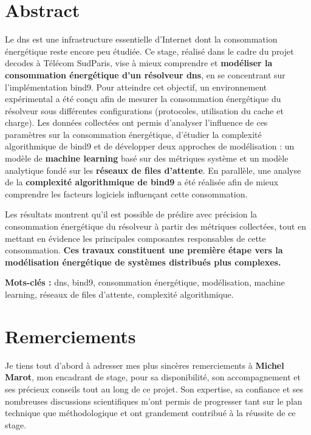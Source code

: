 \documentclass[12pt, a4paper]{report}
\begin{document}
	\renewcommand{\labelitemii}{$\bullet$}

	\arialfont
	\glsdisablehyper


	\makeutbmfrontcover{}
 
	\section*{Abstract}
	\sloppy	
	\noindent Le \gls{dns} est une infrastructure essentielle d'Internet dont la consommation énergétique reste encore peu étudiée. Ce stage, réalisé dans le cadre du projet \gls{decodes} à Télécom SudParis, vise à mieux comprendre et \textbf{modéliser la consommation énergétique d'un résolveur \gls{dns}}, en se concentrant sur l'implémentation \gls{bind9}.
	\fussy
	Pour atteindre cet objectif, un environnement expérimental a été conçu afin de mesurer la consommation énergétique du résolveur sous différentes configurations (protocoles, utilisation du cache et charge). Les données collectées ont permis d'analyser l'influence de ces paramètres sur la consommation énergétique, d'étudier la complexité algorithmique de \gls{bind9} et de développer deux approches de modélisation : un modèle de \textbf{machine learning} basé sur des métriques système et un modèle analytique fondé sur les \textbf{réseaux de files d'attente}. En parallèle, une analyse de la \textbf{complexité algorithmique de \gls{bind9}} a été réalisée afin de mieux comprendre les facteurs logiciels influençant cette consommation.

	Les résultats montrent qu'il est possible de prédire avec précision la consommation énergétique du résolveur à partir des métriques collectées, tout en mettant en évidence les principales composantes responsables de cette consommation. \textbf{Ces travaux constituent une première étape vers la modélisation énergétique de systèmes distribués plus complexes.}

	\textbf{Mots-clés :} \gls{dns}, \gls{bind9}, consommation énergétique, modélisation, machine learning, réseaux de files d'attente, complexité algorithmique.

	
	\newpage

	\section*{Remerciements}

	Je tiens tout d'abord à adresser mes plus sincères remerciements à \textbf{Michel Marot}, mon encadrant de stage, pour sa disponibilité, son accompagnement et ses précieux conseils tout au long de ce projet. Son expertise, sa confiance et ses nombreuses discussions scientifiques m'ont permis de progresser tant sur le plan technique que méthodologique et ont grandement contribué à la réussite de ce stage.
\end{document}
